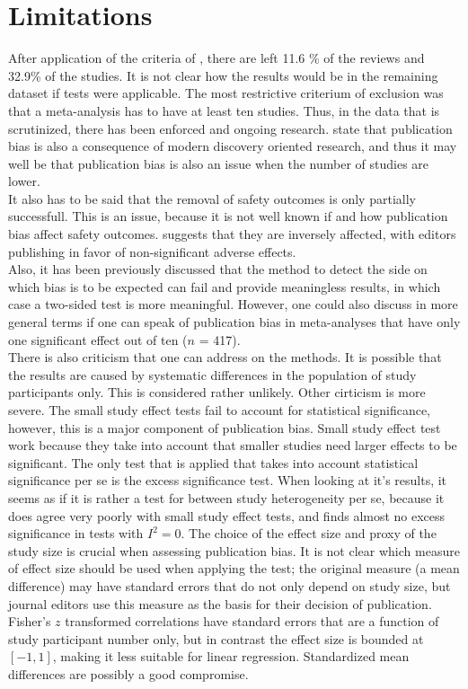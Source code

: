 \documentclass[11pt,a4paper,twoside]{book}\usepackage[]{graphicx}\usepackage[]{color}
\begin{document}
\section{Limitations}
After application of the criteria of \citet{Ioannidis2007}, there are left 11.6 \% of the reviews and 32.9\% of the studies. It is not clear how the results would be in the remaining dataset if tests were applicable. The most restrictive criterium of exclusion was that a meta-analysis has to have at least ten studies. Thus, in the data that is scrutinized, there has been enforced and ongoing research. \citet{ioannidis.2005} state that publication bias is also a consequence of modern discovery oriented research, and thus it may well be that publication bias is also an issue when the number of studies are lower.\\
It also has to be said that the removal of safety outcomes is only partially successfull. This is an issue, because it is not well known if and how publication bias affect safety outcomes. \citet{kicinsky} suggests that they are inversely affected, with editors publishing in favor of non-significant adverse effects. \\
Also, it has been previously discussed that the method to detect the side on which bias is to be expected can fail and provide meaningless results, in which case a two-sided test is more meaningful. However, one could also discuss in more general terms if one can speak of publication bias in meta-analyses that have only one significant effect out of ten ($n$ = 417). \\
There is also criticism that one can address on the methods. It is possible that the results are caused by systematic differences in the population of study participants only. This is considered rather unlikely. Other cirticism is more severe. The small study effect tests fail to account for statistical significance, however, this is a major component of publication bias. Small study effect test work because they take into account that smaller studies need larger effects to be significant. The only test that is applied that takes into account statistical significance per se is the excess significance test. When looking at it's results, it seems as if it is rather a test for between study heterogeneity per se, because it does agree very poorly with small study effect tests, and finds almost no excess significance in tests with $I^2 = 0$. The choice of the effect size and proxy of the study size is crucial when assessing publication bias. It is not clear which measure of effect size should be used when applying the test; the original measure (\eg a mean difference) may have standard errors that do not only depend on study size, but journal editors use this measure as the basis for their decision of publication. Fisher's $z$ transformed correlations have standard errors that are a function of study participant number only, but in contrast the effect size is bounded at$[-1,1]$, making it less suitable for linear regression. Standardized mean differences are possibly a good compromise.\\
\end{document}
